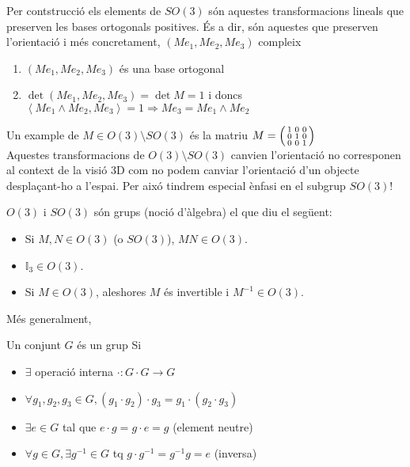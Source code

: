 \documentclass[../main.tex]{subfiles}
\begin{document}
Per contstrucció els elements de $SO(3)$ són aquestes transformacions lineals que preserven les
bases ortogonals positives. És a dir, són aquestes que preserven l'orientació i més concretament,
$\left(Me_1, Me_2, Me_3\right)$ compleix
\begin{enumerate}
    \item $\left(Me_1, Me_2, Me_3\right)$ és una base ortogonal
    \item $\det{\left(Me_1, Me_2, Me_3\right)} = \det{M} = 1$ i doncs $\left\langle Me_1\wedge Me_2, Me_3\right\rangle = 1 \Rightarrow Me_3 = Me_1\wedge Me_2$
\end{enumerate}
Un example de $M \in O(3)\setminus SO(3)$ és la matriu $M = \begin{psmallmatrix}
    1 & 0 & 0\\
    0 & 1 & 0\\
    0 & 0 & 1
\end{psmallmatrix}$\\
Aquestes transformacions de $O(3)\setminus SO(3)$ canvien l'orientació no corresponen al context de
la visió 3D com no podem canviar l'orientació d'un objecte desplaçant-ho a l'espai. Per aixó tindrem
especial ènfasi en el subgrup $SO(3)$!
\begin{obs}
    $O(3)$ i $SO(3)$ són grups (noció d'àlgebra) el que diu el següent:
    \begin{itemize}
        \item Si $M, N \in O(3)$ (o $SO(3)$), $MN \in O(3)$.
        \item $\mathbb{I}_3 \in O(3)$.
        \item Si $M \in O(3)$, aleshores $M$ és invertible i $M^{-1} \in O(3)$.
    \end{itemize}    
\end{obs}
Més generalment,
\begin{definicio}
    Un conjunt $G$ és un grup Si
    \begin{itemize}
        \item $\exists$ operació interna $\cdot : G\cdot G \to G$
        \item $\forall g_1, g_2, g_3 \in G, (g_1\cdot g_2) \cdot g_3 = g_1\cdot (g_2 \cdot g_3)$
        \item $\exists e \in G$ tal que $e\cdot g = g \cdot e = g$ (element neutre)
        \item $\forall g \in G, \exists g^{-1} \in G$ tq $ g\cdot g^{-1} = g^{-1}g = e$ (inversa)
    \end{itemize}
\end{definicio}
\end{document}
